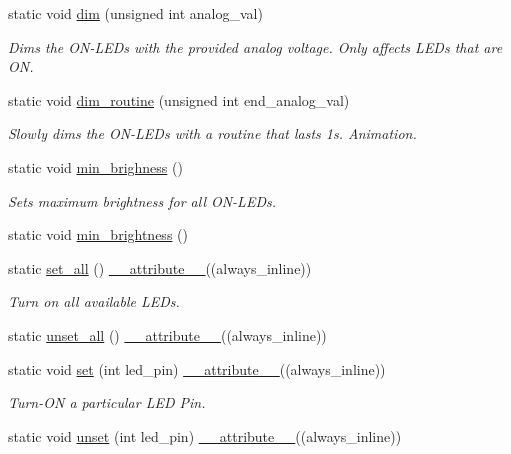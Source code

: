 \begin{DoxyCompactItemize}
static void \hyperlink{classLEDSet_a44ecd0c2c70984a4fade72e0bb79f059}{dim} (unsigned int analog\+\_\+val)
\begin{DoxyCompactList}\small\item\em Dims the O\+N-\/\+L\+E\+Ds with the provided analog voltage. Only affects L\+E\+Ds that are ON. \end{DoxyCompactList}\item 
static void \hyperlink{classLEDSet_a8c3c9d0c3fb93e9722cb892d0ebf2f2f}{dim\+\_\+routine} (unsigned int end\+\_\+analog\+\_\+val)
\begin{DoxyCompactList}\small\item\em Slowly dims the O\+N-\/\+L\+E\+Ds with a routine that lasts 1s.  Animation. \end{DoxyCompactList}\item 
static void \hyperlink{classLEDSet_a3e97e2ccf25adfa7f5f752138e616c96}{min\+\_\+brighness} ()
\begin{DoxyCompactList}\small\item\em Sets maximum brightness for all O\+N-\/\+L\+E\+Ds. \end{DoxyCompactList}\item 
static void \hyperlink{classLEDSet_a27796646d2977615e6c040db6417a4f5}{min\+\_\+brightness} ()
\item 
static \hyperlink{classLEDSet_a978f9404d139d17458d51fd05c5d7466}{set\+\_\+all} () \hyperlink{utilities_8hpp_a103d5b3998e0dd804213c8f30a094f4d}{\+\_\+\+\_\+attribute\+\_\+\+\_\+}((always\+\_\+inline))
\begin{DoxyCompactList}\small\item\em Turn on all available L\+E\+Ds. \end{DoxyCompactList}\item 
static \hyperlink{classLEDSet_a127aca2f0cb95c1776622caa299437c9}{unset\+\_\+all} () \hyperlink{utilities_8hpp_a103d5b3998e0dd804213c8f30a094f4d}{\+\_\+\+\_\+attribute\+\_\+\+\_\+}((always\+\_\+inline))
\item 
static void \hyperlink{classLEDSet_a7d1cc1a76c48f90ed581dd06808b672b}{set} (int led\+\_\+pin) \hyperlink{utilities_8hpp_a103d5b3998e0dd804213c8f30a094f4d}{\+\_\+\+\_\+attribute\+\_\+\+\_\+}((always\+\_\+inline))
\begin{DoxyCompactList}\small\item\em Turn-\/\+ON a particular L\+ED Pin. \end{DoxyCompactList}\item 
static void \hyperlink{classLEDSet_a7285285bd5359c0b7714badd34e9ee9b}{unset} (int led\+\_\+pin) \hyperlink{utilities_8hpp_a103d5b3998e0dd804213c8f30a094f4d}{\+\_\+\+\_\+attribute\+\_\+\+\_\+}((always\+\_\+inline))

\end{DoxyCompactItemize}
